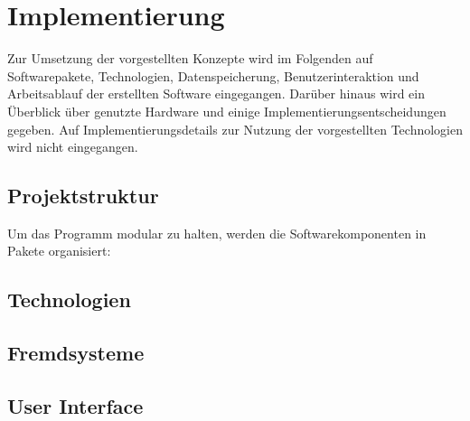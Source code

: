 
\chapter{Implementierung}

Zur Umsetzung der vorgestellten Konzepte wird im Folgenden auf Softwarepakete, Technologien, Datenspeicherung,
Benutzerinteraktion und Arbeitsablauf der erstellten Software eingegangen.
Darüber hinaus wird ein Überblick über genutzte Hardware und einige Implementierungsentscheidungen gegeben.
Auf Implementierungsdetails zur Nutzung der vorgestellten Technologien wird nicht eingegangen.

\section{Projektstruktur}
Um das Programm modular zu halten, werden die Softwarekomponenten in Pakete organisiert:


\section{Technologien}
\section{Fremdsysteme}
\section{User Interface}

